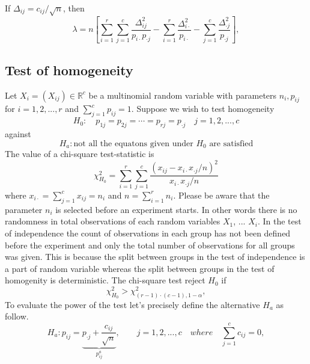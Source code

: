 \documentclass{article}
\begin{document}
If $\Delta_{ij} = c_{ij}/\sqrt{n}$, then 
\begin{equation}\label{independence_lambda}
    \lambda = n\left[\sum_{i=1}^{r}\sum_{j=1}^c \frac{\Delta_{ij}^2}{p_{i\cdot}p_{\cdot j}} - \sum_{i=1}^{r}\frac{\Delta_{i \cdot}^2}{p_{i \cdot}} - \sum_{j=1}^{c}\frac{\Delta_{\cdot j}^2}{p_{\cdot j}}\right],
\end{equation}



\subsection{Test of homogeneity}
Let $X_i=(X_{ij}) \in \mathbb{R}^{c}$ be a multinomial random variable with
parameters $n_{i},p_{ij}$ for $i=1,2,...,r$ and $\sum_{j=1}^cp_{ij}=1$. 
Suppose we wish to test homogeneity
\begin{equation}
    H_0: \quad p_{1j}=p_{2j}=\cdots = p_{rj} = p_{\cdot j}\quad j=1,2,...,c
\end{equation}
against
\begin{equation}
    H_a: \mbox{not all the equatons given under $H_0$ are satisfied}
\end{equation}
The value of a chi-square test-statistic is
\begin{equation}
    \chi^2_{H_0} = \sum_{i=1}^r\sum_{j=1}^c \frac{\left(x_{ij} - x_{i \cdot}x_{\cdot j}/n\right)^2}{x_{i \cdot}x_{\cdot j}/n}
\end{equation}
where $x_{i \cdot} = \sum_{j=1}^c x_{ij} = n_{i}$ and $n = \sum_{i=1}^r n_{i}$. Please be aware that the parameter $n_i$ is selected before an experiment starts. 
In other words there is no randomness in total observations of each random variables $X_1$, ... $X_i$. 
In the test of independence the count of observations in each group has not been defined before the experiment and only the total number of observations for all groups was given.
This is because the split between groups in the test of independence is a part of random variable whereas the split between groups in the test of homogenity is deterministic.
The chi-square test reject $H_0$ if
\begin{equation}
    \chi^2_{H_0} > \chi^2_{(r-1)\cdot(c-1),1-\alpha},
\end{equation}
To evaluate the power of the test let's precisely define the alternative $H_a$ as follow.
\begin{equation}
    H_a: p_{ij} = \underbrace{p_{\cdot j} + \frac{c_{ij}}{\sqrt{n}}}_{p^a_{ij}} , \qquad j=1,2,...,c \quad where \quad \sum_{j=1}^{c}c_{ij}=0, 
\end{equation}
\end{document}

